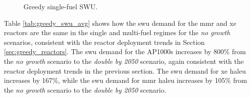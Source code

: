
\begin{figure}[H]
  \hfill
  \caption{Greedy single-fuel SWU.}
  \label{fig:greedy_of_swu}
\end{figure}

Table \ref{tab:greedy_swu_avg} shows how the \gls{swu} demand for the \gls{mmr} and \gls{xe} reactors are the same in the single and multi-fuel regimes for the \textit{no growth} scenarios, consistent with the reactor deployment trends in Section \ref{sec:greedy_reactors}. The \gls{swu} demand for the AP1000s increases by 800\% from the \textit{no growth} scenario to the \textit{double by 2050} scenario, again consistent with the reactor deployment trends in the previous section. The \gls{swu} demand for \gls{xe} \gls{haleu} increases by 167\%, while the \gls{swu} demand for \gls{mmr} \gls{haleu} increases by 105\% from the \textit{no growth} scenario to the \textit{double by 2050} scenario.

